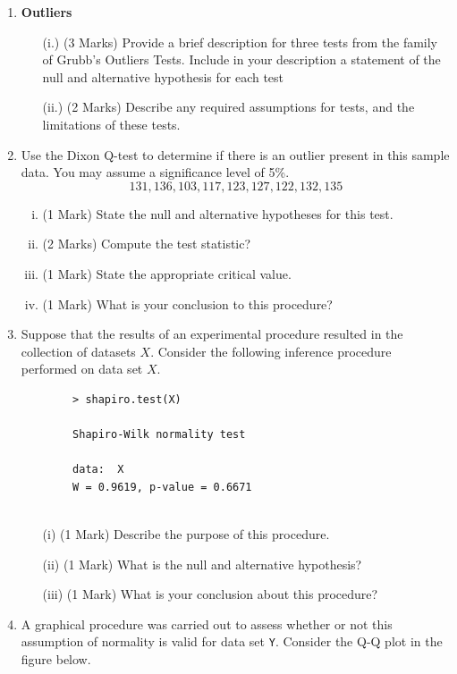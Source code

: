 \documentclass[a4paper,12pt]{article}
\begin{document}
\begin{enumerate}
\item \textbf{Outliers}
\begin{itemize}
	\item[(i.)] (3 Marks) Provide a brief description for three tests from the family of Grubb's  Outliers Tests. Include in your description a statement of the null and alternative hypothesis for each test
	\item[(ii.)] (2 Marks) Describe any required assumptions for tests, and the limitations of these tests.
\end{itemize}
\item Use the Dixon Q-test to determine if there is an outlier present in this sample data. You may assume
a significance level of 5\%.
\[ 131, 136, 103, 117, 123, 127, 122, 132, 135\]
\begin{enumerate}[(i)]
	\item (1 Mark) State the null and alternative hypotheses for this test.
	\item (2 Marks) Compute the test statistic?
	\item (1 Mark) State the appropriate critical value.
	\item (1 Mark) What is your conclusion to this procedure?
\end{enumerate}

\newpage

\item Suppose that the results of an experimental procedure resulted in the collection of datasets $X$. Consider the following inference procedure performed on data set $X$.
\begin{center}
	\begin{framed}
		\begin{verbatim}
		> shapiro.test(X)
		
		Shapiro-Wilk normality test
		
		data:  X
		W = 0.9619, p-value = 0.6671
		
		\end{verbatim}
	\end{framed}
\end{center}


\begin{itemize}
	\item[(i)] (1 Mark) Describe the purpose of this procedure.
	\item[(ii)] (1 Mark) What is the null and alternative hypothesis?
	\item[(iii)] (1 Mark) What is your conclusion about this procedure?
\end{itemize}
\item 
A graphical procedure was carried out to assess whether or not this assumption of normality is valid for data set \texttt{Y}. Consider the Q-Q plot in the figure below.


\end{enumerate}
\end{document}
